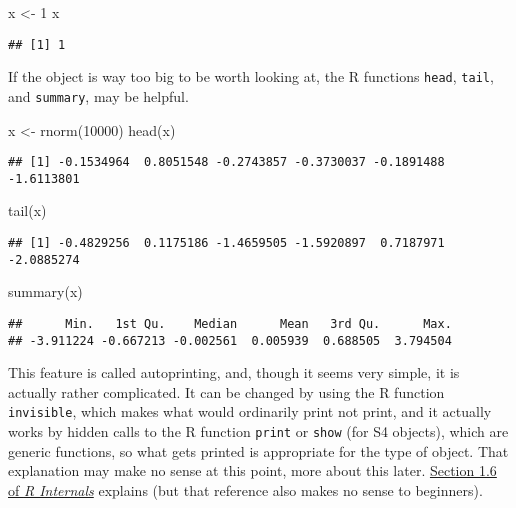 \documentclass[
]{article}
\newenvironment{Shaded}{\begin{snugshade}}{\end{snugshade}}
\newcommand{\DecValTok}[1]{\textcolor[rgb]{0.00,0.00,0.81}{#1}}
\newcommand{\FunctionTok}[1]{\textcolor[rgb]{0.00,0.00,0.00}{#1}}
\newcommand{\NormalTok}[1]{#1}
\newcommand{\OtherTok}[1]{\textcolor[rgb]{0.56,0.35,0.01}{#1}}
\begin{document}
\begin{Shaded}
\begin{Highlighting}[]
\NormalTok{x }\OtherTok{\textless{}{-}} \DecValTok{1}
\NormalTok{x}
\end{Highlighting}
\end{Shaded}

\begin{verbatim}
## [1] 1
\end{verbatim}

If the object is way too big to be worth looking at, the R functions
\texttt{head}, \texttt{tail}, and \texttt{summary}, may be helpful.

\begin{Shaded}
\begin{Highlighting}[]
\NormalTok{x }\OtherTok{\textless{}{-}} \FunctionTok{rnorm}\NormalTok{(}\DecValTok{10000}\NormalTok{)}
\FunctionTok{head}\NormalTok{(x)}
\end{Highlighting}
\end{Shaded}

\begin{verbatim}
## [1] -0.1534964  0.8051548 -0.2743857 -0.3730037 -0.1891488 -1.6113801
\end{verbatim}

\begin{Shaded}
\begin{Highlighting}[]
\FunctionTok{tail}\NormalTok{(x)}
\end{Highlighting}
\end{Shaded}

\begin{verbatim}
## [1] -0.4829256  0.1175186 -1.4659505 -1.5920897  0.7187971 -2.0885274
\end{verbatim}

\begin{Shaded}
\begin{Highlighting}[]
\FunctionTok{summary}\NormalTok{(x)}
\end{Highlighting}
\end{Shaded}

\begin{verbatim}
##      Min.   1st Qu.    Median      Mean   3rd Qu.      Max. 
## -3.911224 -0.667213 -0.002561  0.005939  0.688505  3.794504
\end{verbatim}

This feature is called autoprinting, and, though it seems very simple,
it is actually rather complicated. It can be changed by using the R
function \texttt{invisible}, which makes what would ordinarily print not
print, and it actually works by hidden calls to the R function
\texttt{print} or \texttt{show} (for S4 objects), which are generic
functions, so what gets printed is appropriate for the type of object.
That explanation may make no sense at this point, more about this later.
\href{https://cloud.r-project.org/doc/manuals/r-release/R-ints.html\#Autoprinting}{Section
1.6 of \emph{R Internals}} explains (but that reference also makes no
sense to beginners).
\end{document}
